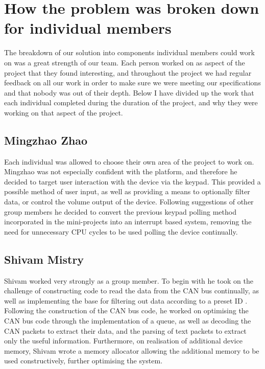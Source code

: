 \section{How the problem was broken down for individual members}

The breakdown of our solution into components individual members could work on 
was a great strength of our team. Each person worked on as aspect of the project 
that they found interesting, and throughout the project we had regular feedback 
on all our work in order to make sure we were meeting our specifications and 
that nobody was out of their depth. Below I have divided up the work that each 
individual completed during the duration of the project, and why they were 
working on that aspect of the project. 

\subsection*{Mingzhao Zhao}
Each individual was allowed to choose their own area of the project to work on. 
Mingzhao was not especially confident with the platform, and therefore he 
decided to target user interaction with the device via the keypad. This 
provided a possible method of user input, as well as providing a means to 
optionally filter data, or control the volume output of the device. 
Following suggestions 
of other group members he decided to convert the previous keypad polling method 
incorporated in the mini-projects into an interrupt based system, removing the 
need for unnecessary CPU cycles to be used polling the device continually. 

\subsection*{Shivam Mistry} 
Shivam worked very strongly as a group member. To begin with he took on the 
challenge of constructing code to read the data from the CAN bus continually, 
as well as implementing the base for filtering out data according to a preset ID
. Following the construction of the CAN bus code, he worked on optimising the 
CAN bus code through the
implementation of a queue, as well as decoding the CAN packets to extract their
data, and the parsing of text packets to extract only the useful information. 
Furthermore, on realisation of additional device memory, Shivam wrote a memory 
allocator allowing the additional memory to be used constructively, further 
optimising the system. 


